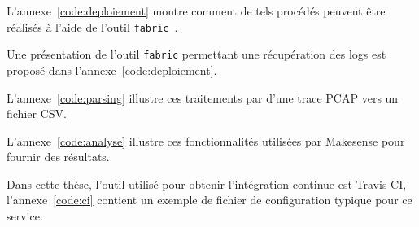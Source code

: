 
L'annexe~\ref{code:deploiement} montre comment de tels procédés peuvent être réalisés à l'aide de l'outil \texttt{fabric}~\cite{fabric}.

Une présentation de l'outil \texttt{fabric} permettant une récupération des logs est proposé dans l'annexe~\ref{code:deploiement}.

L'annexe~\ref{code:parsing} illustre ces traitements par d'une trace \ac{PCAP} vers un fichier \ac{CSV}.

L'annexe~\ref{code:analyse} illustre ces fonctionnalités utilisées par Makesense pour fournir des résultats. 

Dans cette thèse, l'outil utilisé pour obtenir l'intégration continue est Travis-CI, l'annexe~\ref{code:ci} contient un exemple de fichier de configuration typique pour ce service.







